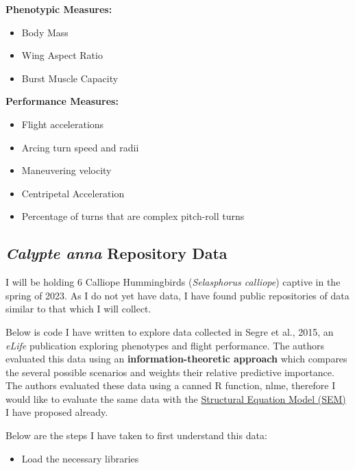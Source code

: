 \documentclass[
  letterpaper,
  DIV=11,
  numbers=noendperiod]{scrartcl}
\providecommand{\tightlist}{%
  \setlength{\itemsep}{0pt}\setlength{\parskip}{0pt}}\usepackage{longtable,booktabs,array}
\begin{document}
\textbf{Phenotypic Measures:}

\begin{itemize}
\item
  Body Mass
\item
  Wing Aspect Ratio
\item
  Burst Muscle Capacity
\end{itemize}

\textbf{Performance Measures:}

\begin{itemize}
\item
  Flight accelerations
\item
  Arcing turn speed and radii
\item
  Maneuvering velocity
\item
  Centripetal Acceleration
\item
  Percentage of turns that are complex pitch-roll turns
\end{itemize}

\hypertarget{calypte-anna-repository-data}{%
\subsection{\texorpdfstring{\emph{Calypte anna} Repository
Data}{Calypte anna Repository Data}}\label{calypte-anna-repository-data}}

I will be holding 6 Calliope Hummingbirds (\emph{Selasphorus calliope})
captive in the spring of 2023. As I do not yet have data, I have found
public repositories of data similar to that which I will collect.

Below is code I have written to explore data collected in Segre et al.,
2015, an \emph{eLife} publication exploring phenotypes and flight
performance. The authors evaluated this data using an
\textbf{information-theoretic approach} which compares the several
possible scenarios and weights their relative predictive importance. The
authors evaluated these data using a canned R function, nlme, therefore
I would like to evaluate the same data with the
\protect\hyperlink{structural-equation-model-sem}{Structural Equation
Model (SEM)} I have proposed already.

Below are the steps I have taken to first understand this data:

\begin{itemize}
\tightlist
\item
  Load the necessary libraries
\end{itemize}
\end{document}
